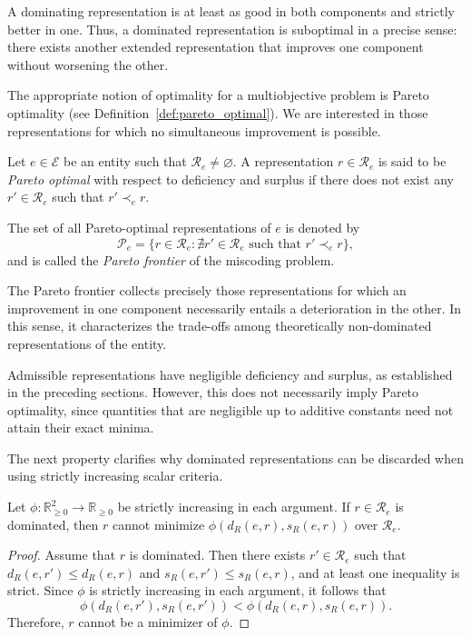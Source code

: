 A dominating representation is at least as good in both components and strictly better in one. Thus, a dominated representation is suboptimal in a precise sense: there exists another extended representation that improves one component without worsening the other.

The appropriate notion of optimality for a multiobjective problem is Pareto optimality (see Definition~\ref{def:pareto_optimal}). We are interested in those representations for which no simultaneous improvement is possible.

\begin{definition}
\label{def:pareto_miscoding}
Let $e\in\mathcal E$ be an entity such that $\mathcal R_e\neq\varnothing$. A representation $r\in\mathcal R_e$ is said to be \emph{Pareto optimal} with respect to deficiency and surplus if there does not exist any $r'\in\mathcal R_e$ such that $r'\prec_e r$.

The set of all Pareto-optimal representations of $e$ is denoted by
\[
\mathcal P_e = \bigl\{ r\in\mathcal R_e: \nexists r'\in\mathcal R_e \text{ such that }r'\prec_e r \bigr\},
\]
and is called the \emph{Pareto frontier} of the miscoding problem.
\end{definition}

The Pareto frontier collects precisely those representations for which an improvement in one component necessarily entails a deterioration in the other. In this sense, it characterizes the trade-offs among theoretically non-dominated representations of the entity.

Admissible representations have negligible deficiency and surplus, as established in the preceding sections. However, this does not necessarily imply Pareto optimality, since quantities that are negligible up to additive constants need not attain their exact minima.

The next property clarifies why dominated representations can be discarded when using strictly increasing scalar criteria.

\begin{proposition}
\label{prop:dominated_not_minimal_increasing_scalarization}
Let $\phi:\mathbb R_{\ge 0}^2\to\mathbb R_{\ge 0}$ be strictly increasing in each argument. If $r\in\mathcal R_e$ is dominated, then $r$ cannot minimize $\phi(d_R(e,r),s_R(e,r))$ over $\mathcal R_e$.
\end{proposition}
\begin{proof}
Assume that $r$ is dominated. Then there exists $r'\in\mathcal R_e$ such that $d_R(e,r')\le d_R(e,r)$ and $s_R(e,r')\le s_R(e,r)$, and at least one inequality is strict. Since $\phi$ is strictly increasing in each argument, it follows that
\[
\phi(d_R(e,r'),s_R(e,r')) < \phi(d_R(e,r),s_R(e,r)).
\]
Therefore, $r$ cannot be a minimizer of $\phi$.
\end{proof}

